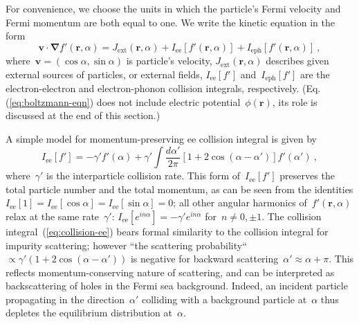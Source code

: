 \documentclass[preprint,aps,eqsecnum, prb]{revtex4-1}
\begin{document}
For convenience, we choose the units in which the particle's
Fermi velocity and Fermi momentum are both equal to one.
We write the kinetic equation in the form
\begin{equation}
  \label{eq:boltzmann-eqn}
{\bm v}\cdot{\bm \nabla} f'({\bm r}, \alpha)
= J_{\mathrm{ext}}({\bm r}, \alpha) + I_\mathrm{ee}[f'({\bm r}, \alpha)]
+ I_\mathrm{eph}[f'({\bm r}, \alpha)]
\ ,
\end{equation}
where~${\bm v} = (\cos\alpha, \sin\alpha)$ is particle's velocity,
$J_\mathrm{ext}({\bm r}, \alpha)$ describes given external sources
of particles, or external fields, $I_\mathrm{ee}[f']$
and~$I_\mathrm{eph}[f']$ are the electron-electron and
electron-phonon collision integrals, respectively.
(Eq.(\ref{eq:boltzmann-eqn}) does not include electric
potential~$\phi({\bm r})$,
its role is discussed at the end of this section.)

A simple model for momentum-preserving ee collision integral is given
by~\cite{Molenkamp}
\begin{equation}
\label{eq:collision-ee}
I_\mathrm{ee}[f'] = - \gamma' f'(\alpha)
  + \gamma' \int \frac{d\alpha'}{2\pi}
  \left[1 + 2 \cos(\alpha - \alpha') \right] f'(\alpha')
\ ,
\end{equation}
where~$\gamma'$ is the interparticle collision rate.
This form of~$I_\mathrm{ee}[f']$
preserves the total particle number
and the total momentum, as can be seen from the identities
$I_\mathrm{ee}[1] = I_\mathrm{ee}[\cos\alpha] = I_\mathrm{ee}[\sin\alpha] = 0$;
all other angular harmonics of~$f'({\bm r}, \alpha)$
relax at the same rate~$\gamma'$:
 $I_\mathrm{ee} [e^{i n \alpha}] = - \gamma' e^{i n\alpha} $
 for~$n\neq 0, \pm 1$.
The collision integral~(\ref{eq:collision-ee}) bears formal similarity
to the collision integral for impurity scattering; however ``the
scattering probability`` $\propto \gamma'( 1 + 2\cos(\alpha-\alpha'))$
is negative for backward scattering~$\alpha' \approx \alpha + \pi$.
This reflects momentum-conserving nature of scattering, and can be
interpreted as backscattering of holes in the Fermi sea background.
Indeed, an incident  particle propagating in the direction~$\alpha'$ colliding  with a background  particle at~$\alpha$ thus depletes the equilibrium distribution at~$\alpha$.
\end{document}
